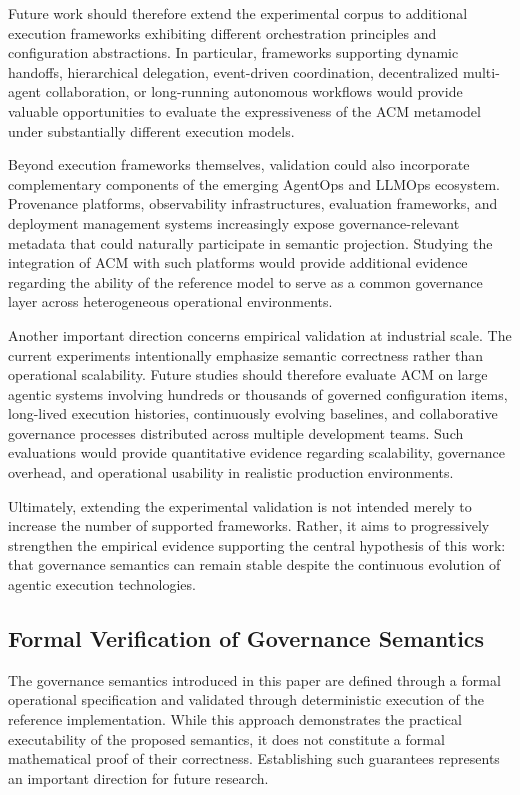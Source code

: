 \documentclass[10pt]{article}
\begin{document}
Future work should therefore extend the experimental corpus to additional execution frameworks exhibiting different orchestration principles and configuration abstractions. In particular, frameworks supporting dynamic handoffs, hierarchical delegation, event-driven coordination, decentralized multi-agent collaboration, or long-running autonomous workflows would provide valuable opportunities to evaluate the expressiveness of the ACM metamodel under substantially different execution models.

Beyond execution frameworks themselves, validation could also incorporate complementary components of the emerging AgentOps and LLMOps ecosystem. Provenance platforms, observability infrastructures, evaluation frameworks, and deployment management systems increasingly expose governance-relevant metadata that could naturally participate in semantic projection. Studying the integration of ACM with such platforms would provide additional evidence regarding the ability of the reference model to serve as a common governance layer across heterogeneous operational environments.

Another important direction concerns empirical validation at industrial scale. The current experiments intentionally emphasize semantic correctness rather than operational scalability. Future studies should therefore evaluate ACM on large agentic systems involving hundreds or thousands of governed configuration items, long-lived execution histories, continuously evolving baselines, and collaborative governance processes distributed across multiple development teams. Such evaluations would provide quantitative evidence regarding scalability, governance overhead, and operational usability in realistic production environments.

Ultimately, extending the experimental validation is not intended merely to increase the number of supported frameworks. Rather, it aims to progressively strengthen the empirical evidence supporting the central hypothesis of this work: that governance semantics can remain stable despite the continuous evolution of agentic execution technologies.

\subsection{Formal Verification of Governance Semantics}
\label{sec:future_formal_verification}

The governance semantics introduced in this paper are defined through a formal operational specification and validated through deterministic execution of the reference implementation. While this approach demonstrates the practical executability of the proposed semantics, it does not constitute a formal mathematical proof of their correctness. Establishing such guarantees represents an important direction for future research.
\end{document}

